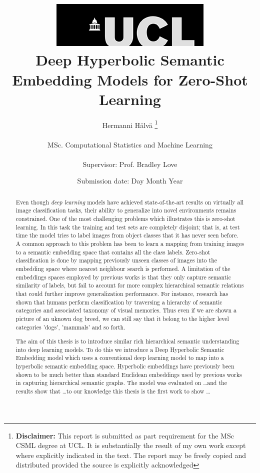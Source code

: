 \documentclass[12pt]{report}
\title{  	{ \includegraphics[scale=.5]{ucl_logo.png}}\\
{{\Huge Deep Hyperbolic Semantic Embedding Models for Zero-Shot Learning}}\\
		}
\date{Submission date: Day Month Year}
\author{Hermanni H{\"a}lv{\"a} \thanks{
{\bf Disclaimer:}
This report is submitted as part requirement for the MSc CSML degree at UCL. It is
substantially the result of my own work except where explicitly indicated in the text.
The report may be freely copied and distributed provided the source is explicitly acknowledged
\newline  %
}
\\ \\
MSc. Computational Statistics and Machine Learning\\ \\
Supervisor: Prof. Bradley Love}
\begin{document}
 
\onehalfspacing
\maketitle

\begin{abstract}
Even though \textit{deep learning} models have achieved state-of-the-art results on virtually all image classification tasks, their ability to generalize into novel environments remains constrained. One of the most challenging problems which illustrates this is zero-shot learning. In this task the training and test sets are completely disjoint; that is, at test time the model tries to label images from object classes that it has never seen before. A common approach to this problem has been to learn a mapping from training images to a semantic embedding space that contains all the class labels. Zero-shot classification is done by mapping previously unseen classes of images into the embedding space where nearest neighbour search is performed. A limitation of the embeddings spaces employed by previous works is that they only capture semantic similarity of labels, but fail to account for more complex hierarchical semantic relations that could further improve generalization performance. For instance, research has shown that humans perform classification by traversing a hierarchy of semantic categories and associated taxonomy of visual memories. Thus even if we are shown a picture of an uknown dog breed, we can still say that it belong to the higher level categories 'dogs', 'mammals' and so forth. 

The aim of this thesis is to introduce similar rich hierarchical semantic understanding into deep learning models. To do this we introduce a Deep Hyperbolic Semantic Embedding model which uses a conventional deep learning model to map into a hyperbolic semantic embedding space. Hyperbolic embeddings have previously been shown to be much better than standard Euclidean embeddings used by previous works in capturing hierarchical semantic graphs. The model was evaluated on \dots and the results show that \dots to our knowledge this thesis is the first work to show \dots



\end{abstract}
\end{document}
